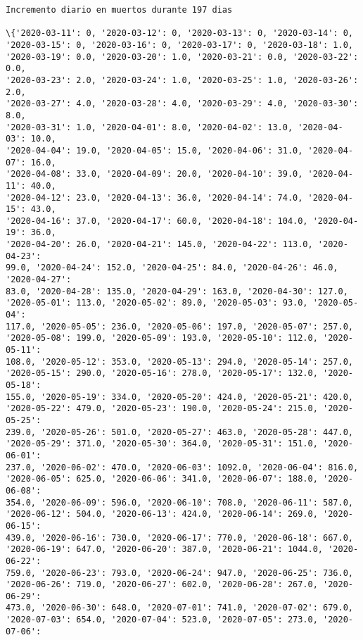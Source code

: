 \documentclass[11pt]{article}
\begin{document}
    \begin{Verbatim}[commandchars=\\\{\}]
Incremento diario en muertos durante 197 dias

\{'2020-03-11': 0, '2020-03-12': 0, '2020-03-13': 0, '2020-03-14': 0,
'2020-03-15': 0, '2020-03-16': 0, '2020-03-17': 0, '2020-03-18': 1.0,
'2020-03-19': 0.0, '2020-03-20': 1.0, '2020-03-21': 0.0, '2020-03-22': 0.0,
'2020-03-23': 2.0, '2020-03-24': 1.0, '2020-03-25': 1.0, '2020-03-26': 2.0,
'2020-03-27': 4.0, '2020-03-28': 4.0, '2020-03-29': 4.0, '2020-03-30': 8.0,
'2020-03-31': 1.0, '2020-04-01': 8.0, '2020-04-02': 13.0, '2020-04-03': 10.0,
'2020-04-04': 19.0, '2020-04-05': 15.0, '2020-04-06': 31.0, '2020-04-07': 16.0,
'2020-04-08': 33.0, '2020-04-09': 20.0, '2020-04-10': 39.0, '2020-04-11': 40.0,
'2020-04-12': 23.0, '2020-04-13': 36.0, '2020-04-14': 74.0, '2020-04-15': 43.0,
'2020-04-16': 37.0, '2020-04-17': 60.0, '2020-04-18': 104.0, '2020-04-19': 36.0,
'2020-04-20': 26.0, '2020-04-21': 145.0, '2020-04-22': 113.0, '2020-04-23':
99.0, '2020-04-24': 152.0, '2020-04-25': 84.0, '2020-04-26': 46.0, '2020-04-27':
83.0, '2020-04-28': 135.0, '2020-04-29': 163.0, '2020-04-30': 127.0,
'2020-05-01': 113.0, '2020-05-02': 89.0, '2020-05-03': 93.0, '2020-05-04':
117.0, '2020-05-05': 236.0, '2020-05-06': 197.0, '2020-05-07': 257.0,
'2020-05-08': 199.0, '2020-05-09': 193.0, '2020-05-10': 112.0, '2020-05-11':
108.0, '2020-05-12': 353.0, '2020-05-13': 294.0, '2020-05-14': 257.0,
'2020-05-15': 290.0, '2020-05-16': 278.0, '2020-05-17': 132.0, '2020-05-18':
155.0, '2020-05-19': 334.0, '2020-05-20': 424.0, '2020-05-21': 420.0,
'2020-05-22': 479.0, '2020-05-23': 190.0, '2020-05-24': 215.0, '2020-05-25':
239.0, '2020-05-26': 501.0, '2020-05-27': 463.0, '2020-05-28': 447.0,
'2020-05-29': 371.0, '2020-05-30': 364.0, '2020-05-31': 151.0, '2020-06-01':
237.0, '2020-06-02': 470.0, '2020-06-03': 1092.0, '2020-06-04': 816.0,
'2020-06-05': 625.0, '2020-06-06': 341.0, '2020-06-07': 188.0, '2020-06-08':
354.0, '2020-06-09': 596.0, '2020-06-10': 708.0, '2020-06-11': 587.0,
'2020-06-12': 504.0, '2020-06-13': 424.0, '2020-06-14': 269.0, '2020-06-15':
439.0, '2020-06-16': 730.0, '2020-06-17': 770.0, '2020-06-18': 667.0,
'2020-06-19': 647.0, '2020-06-20': 387.0, '2020-06-21': 1044.0, '2020-06-22':
759.0, '2020-06-23': 793.0, '2020-06-24': 947.0, '2020-06-25': 736.0,
'2020-06-26': 719.0, '2020-06-27': 602.0, '2020-06-28': 267.0, '2020-06-29':
473.0, '2020-06-30': 648.0, '2020-07-01': 741.0, '2020-07-02': 679.0,
'2020-07-03': 654.0, '2020-07-04': 523.0, '2020-07-05': 273.0, '2020-07-06':

\end{Verbatim}
\end{document}
